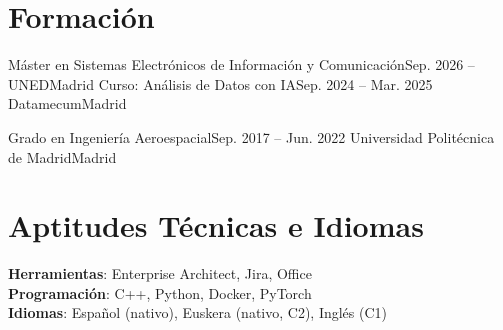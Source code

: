 \resumeSubHeadingListEnd

\section{Formación}
\resumeSubHeadingListStart
  \resumeSubheading
    {Máster en Sistemas Electrónicos de Información y Comunicación}{Sep. 2026 -- }
    {UNED}{Madrid}
  \resumeSubheading
    {Curso: Análisis de Datos con IA}{Sep. 2024 -- Mar. 2025}
    {Datamecum}{Madrid}

  \resumeSubheading
    {Grado en Ingeniería Aeroespacial}{Sep. 2017 -- Jun. 2022}
    {Universidad Politécnica de Madrid}{Madrid}
  
\resumeSubHeadingListEnd

\section{Aptitudes Técnicas e Idiomas}
\begin{itemize}[leftmargin=0.15in, label={}]
  \small{\item{
    \textbf{Herramientas}{: Enterprise Architect, Jira, Office} \\
    \textbf{Programación}{: C++, Python, Docker, PyTorch} \\
    \textbf{Idiomas}{: Español (nativo), Euskera (nativo, C2), Inglés (C1)}
  }}
\end{itemize}
